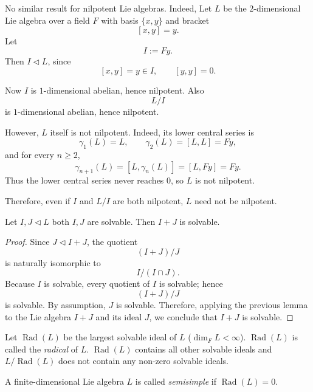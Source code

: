 \begin{example}
    No similar result for nilpotent Lie algebras. Indeed,
    Let $L$ be the $2$-dimensional Lie algebra over a field $F$ with basis $\{x,y\}$ and bracket
    \[
        [x,y]=y.
    \]
    Let
    \[
        I:=Fy.
    \]
    Then $I\triangleleft L$, since
    \[
        [x,y]=y\in I,\qquad [y,y]=0.
    \]

    Now $I$ is $1$-dimensional abelian, hence nilpotent. Also
    \[
        L/I
    \]
    is $1$-dimensional abelian, hence nilpotent.

    However, $L$ itself is not nilpotent. Indeed, its lower central series is
    \[
        \gamma_1(L)=L,\qquad \gamma_2(L)=[L,L]=Fy,
    \]
    and for every $n\ge 2$,
    \[
        \gamma_{n+1}(L)=[L,\gamma_n(L)]=[L,Fy]=Fy.
    \]
    Thus the lower central series never reaches $0$, so $L$ is not nilpotent.

    Therefore, even if $I$ and $L/I$ are both nilpotent, $L$ need not be nilpotent.
\end{example}

\begin{lemma}
    Let $I,J \triangleleft L$ both $I,J$ are solvable. Then $I+J$ is solvable.
\end{lemma}

\begin{proof}
    Since $J \triangleleft I+J$, the quotient
    \[
        (I+J)/J
    \]
    is naturally isomorphic to
    \[
        I/(I\cap J).
    \]
    Because $I$ is solvable, every quotient of $I$ is solvable; hence
    \[
        (I+J)/J
    \]
    is solvable. By assumption, $J$ is solvable. Therefore, applying the previous lemma to the Lie algebra $I+J$ and its ideal $J$, we conclude that $I+J$ is solvable.
\end{proof}

Let $\operatorname{Rad}(L)$ be the largest solvable ideal of $L$ ($\operatorname{dim}_FL< \infty$). $\operatorname{Rad}(L)$ is called the \emph{radical} of $L$. $\operatorname{Rad}(L)$ contains all other solvable ideals and $L/\operatorname{Rad}(L)$ does not contain any non-zero solvable ideals.

\begin{definition}
    A finite-dimensional Lie algebra $L$ is called \emph{semisimple} if $\operatorname{Rad}(L)=0$.
\end{definition}

